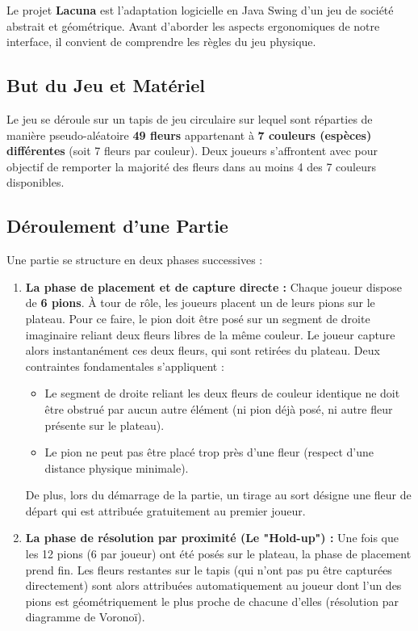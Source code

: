 \documentclass[11pt,a4paper]{article}
\begin{document}
Le projet \textbf{Lacuna} est l'adaptation logicielle en Java Swing d'un jeu de société abstrait et géométrique. Avant d'aborder les aspects ergonomiques de notre interface, il convient de comprendre les règles du jeu physique.

\subsection{But du Jeu et Matériel}
Le jeu se déroule sur un tapis de jeu circulaire sur lequel sont réparties de manière pseudo-aléatoire \textbf{49 fleurs} appartenant à \textbf{7 couleurs (espèces) différentes} (soit 7 fleurs par couleur). Deux joueurs s'affrontent avec pour objectif de remporter la majorité des fleurs dans au moins 4 des 7 couleurs disponibles.

\subsection{Déroulement d'une Partie}
Une partie se structure en deux phases successives :
\begin{enumerate}
    \item \textbf{La phase de placement et de capture directe :}
    Chaque joueur dispose de \textbf{6 pions}. À tour de rôle, les joueurs placent un de leurs pions sur le plateau. Pour ce faire, le pion doit être posé sur un segment de droite imaginaire reliant deux fleurs libres de la même couleur. Le joueur capture alors instantanément ces deux fleurs, qui sont retirées du plateau.
    Deux contraintes fondamentales s'appliquent :
    \begin{itemize}
        \item Le segment de droite reliant les deux fleurs de couleur identique ne doit être obstrué par aucun autre élément (ni pion déjà posé, ni autre fleur présente sur le plateau).
        \item Le pion ne peut pas être placé trop près d'une fleur (respect d'une distance physique minimale).
    \end{itemize}
    De plus, lors du démarrage de la partie, un tirage au sort désigne une fleur de départ qui est attribuée gratuitement au premier joueur.
    
    \item \textbf{La phase de résolution par proximité (Le "Hold-up") :}
    Une fois que les 12 pions (6 par joueur) ont été posés sur le plateau, la phase de placement prend fin. Les fleurs restantes sur le tapis (qui n'ont pas pu être capturées directement) sont alors attribuées automatiquement au joueur dont l'un des pions est géométriquement le plus proche de chacune d'elles (résolution par diagramme de Voronoï).
\end{enumerate}
\end{document}

